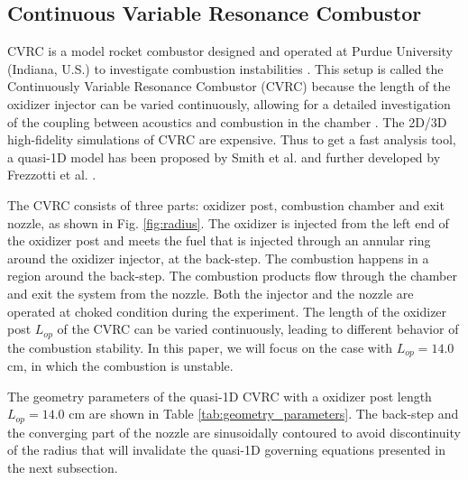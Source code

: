 \subsection{Continuous Variable Resonance Combustor} \label{sec:5.res.4}

CVRC is a model rocket combustor designed and operated at Purdue University (Indiana, U.S.) to investigate combustion instabilities \cite{yu2008combustion}. This setup is called the Continuously Variable Resonance Combustor (CVRC) because the length of the oxidizer injector can be varied continuously, allowing for a detailed investigation of the coupling between acoustics and combustion in the chamber \cite{garby2013simulations}. The 2D/3D high-fidelity simulations of CVRC are expensive. Thus to get a fast analysis tool, a quasi-1D model has been proposed by Smith et al. \cite{smith2008computational} and further developed by Frezzotti et al. \cite{frezzotti2015determination,frezzotti2017numerical,frezzotti2018quasi}. 


The CVRC consists of three parts: oxidizer post, combustion chamber and exit nozzle, as shown in Fig. \ref{fig:radius}. The oxidizer is injected from the left end of the oxidizer post and meets the fuel that is injected through an annular ring around the oxidizer injector, at the back-step. The combustion happens in a region around the back-step. The combustion products flow through the chamber and exit the system from the nozzle.  Both the injector and the nozzle are operated at choked condition during the experiment. The length of the oxidizer post $L_{op}$ of the CVRC can be varied continuously, leading to different behavior of the combustion stability. In this paper, we will focus on the case with $L_{op}= 14.0$ cm, in which the combustion is unstable.

The geometry parameters of the quasi-1D CVRC with a oxidizer post length  $L_{op}= 14.0$ cm are shown in Table \ref{tab:geometry_parameters}.  The back-step and the converging part of the nozzle are sinusoidally contoured to avoid discontinuity of the radius that will invalidate the quasi-1D governing equations presented in the next subsection. 

